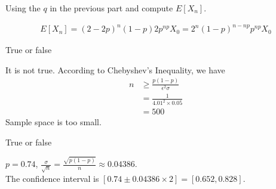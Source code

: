 \documentclass[11pt]{article}
\begin{document}
\begin{Parts}
    \Part Using the $q$ in the previous part and compute $E[X_n]$. 

    \begin{Answer}
        \begin{align*}
            E[X_n] = (2 - 2p)^n(1-p) 2p^{np}X_0 = 2^n(1-p)^{n - np}p^{np}X_0
        \end{align*}
    \end{Answer}

    \Part True or false
    \begin{Answer}
        It is not true. According to Chebyshev’s Inequality, we have 
        \begin{align*}
            n &\geq \frac{p(1-p)}{\epsilon^2\sigma} \\
              &= \frac{1}{4.01^2 \times 0.05} \\
              &= 500
        \end{align*}
        Sample space is too small. 
    \end{Answer}

    \Part True or false
    \begin{Answer}
        $p = 0.74$, $\frac{\sigma}{\sqrt{n}} = \frac{\sqrt{p(1-p)}}{n} \approx 0.04386$. \\
        The confidence interval is $[0.74 \pm 0.04386 \times 2] = [0.652, 0.828]$.
    \end{Answer}
\end{Parts}

\newpage
{}
\end{document}
